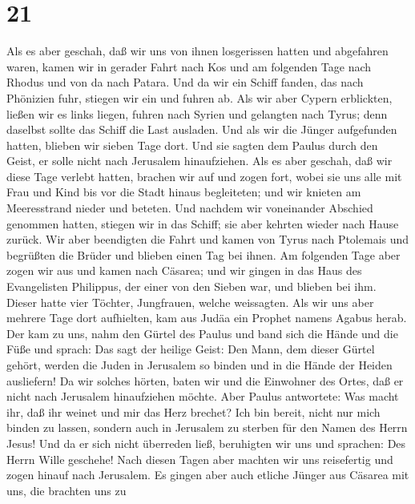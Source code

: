 \hypertarget{section-20}{%
\section{21}\label{section-20}}

 Als es aber geschah, daß wir uns von ihnen losgerissen
hatten und abgefahren waren, kamen wir in gerader Fahrt nach Kos und am
folgenden Tage nach Rhodus und von da nach Patara.  Und da
wir ein Schiff fanden, das nach Phönizien fuhr, stiegen wir ein und
fuhren ab.  Als wir aber Cypern erblickten, ließen wir es
links liegen, fuhren nach Syrien und gelangten nach Tyrus; denn daselbst
sollte das Schiff die Last ausladen.  Und als wir die
Jünger aufgefunden hatten, blieben wir sieben Tage dort. Und sie sagten
dem Paulus durch den Geist, er solle nicht nach Jerusalem hinaufziehen.
 Als es aber geschah, daß wir diese Tage verlebt hatten,
brachen wir auf und zogen fort, wobei sie uns alle mit Frau und Kind bis
vor die Stadt hinaus begleiteten; und wir knieten am Meeresstrand nieder
und beteten.  Und nachdem wir voneinander Abschied
genommen hatten, stiegen wir in das Schiff; sie aber kehrten wieder nach
Hause zurück.  Wir aber beendigten die Fahrt und kamen von
Tyrus nach Ptolemais und begrüßten die Brüder und blieben einen Tag bei
ihnen.  Am folgenden Tage aber zogen wir aus und kamen
nach Cäsarea; und wir gingen in das Haus des Evangelisten Philippus, der
einer von den Sieben war, und blieben bei ihm.  Dieser
hatte vier Töchter, Jungfrauen, welche weissagten.  Als
wir uns aber mehrere Tage dort aufhielten, kam aus Judäa ein Prophet
namens Agabus herab.  Der kam zu uns, nahm den Gürtel des
Paulus und band sich die Hände und die Füße und sprach: Das sagt der
heilige Geist: Den Mann, dem dieser Gürtel gehört, werden die Juden in
Jerusalem so binden und in die Hände der Heiden ausliefern!
 Da wir solches hörten, baten wir und die Einwohner des
Ortes, daß er nicht nach Jerusalem hinaufziehen möchte. 
Aber Paulus antwortete: Was macht ihr, daß ihr weinet und mir das Herz
brechet? Ich bin bereit, nicht nur mich binden zu lassen, sondern auch
in Jerusalem zu sterben für den Namen des Herrn Jesus! 
Und da er sich nicht überreden ließ, beruhigten wir uns und sprachen:
Des Herrn Wille geschehe!  Nach diesen Tagen aber machten
wir uns reisefertig und zogen hinauf nach Jerusalem.  Es
gingen aber auch etliche Jünger aus Cäsarea mit uns, die brachten uns zu

